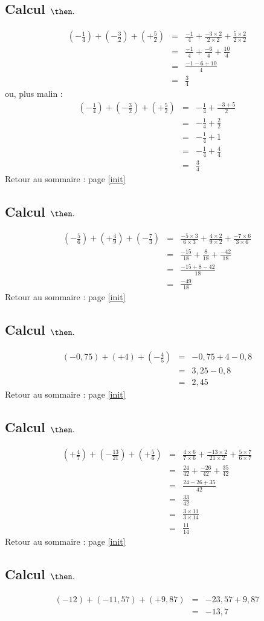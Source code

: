 \documentclass[14pt]{article}
\theoremstyle{remark}
\newcounter{n}
\renewcommand{\it}{Retour au sommaire : page \ref{init}
	\subsection{Calcul $ \mathbf{ \then}.$}\label{\then} \stepcounter{n} }
\theoremstyle{plain}
\begin{document}
	\subsection{Calcul $ \mathbf{ \then}.$}\label{\then}  
 \begin{eqnarray*}
\left(-\frac14\right)+\left(-\frac32\right)+\left(+\frac52\right) & = & \frac{-1}4 + \frac{-3\times 2}{2\times2} + \frac{5\times2}{2\times2} \\
&=& \frac{-1}4 + \frac{-6}4 + \frac{10}4\\
&=& \frac{-1-6+10}4\\
&=& \frac{3}4
\end{eqnarray*} 
ou, plus malin : \begin{eqnarray*}
\left(-\frac14\right)+\left(-\frac32\right)+\left(+\frac52\right) & = & -\frac14 + \frac{-3+5}2\\
& =& - \frac14 + \frac{2}2\\
&=& -\frac14+1\\
&=& -\frac14+\frac44 \\
&=& \frac34
\end{eqnarray*} 
\it \begin{eqnarray*}
\left(-\frac56\right)+\left(+\frac49\right)+\left(-\frac73\right) &= & \frac{-5\times3}{6\times3} + \frac{4\times2}{9\times2} + \frac{-7\times 6}{3\times 6} \\ 
&=& \frac{-15}{18} + \frac{8}{18} +\frac{-42}{18} \\
&=& \frac{-15+8-42}{18}\\
&=& \frac{-49}{18}
\end{eqnarray*}
\it \begin{eqnarray*}(-0,75) + (+4) + \left(-\frac45\right) & =& -0,75 + 4 - 0,8 \\ 
&=& 3,25 - 0,8\\
&=& 2,45
\end{eqnarray*}
\it \begin{eqnarray*}
\left(+\frac47\right)+\left(-\frac{13}{21}\right)+\left(+\frac56\right) &=& \frac{4\times6}{7\times6} + \frac{-13\times2}{21\times2} + \frac{5\times7}{6\times 7} \\
&=& \frac{24}{42} + \frac{-26}{42} + \frac{35}{42}\\
&=& \frac{24-26+35}{42}\\
&=& \frac{33}{42}\\
&=& \frac{3\times 11}{3\times 14}\\
&=& \frac{11}{14}
\end{eqnarray*}
\it \begin{eqnarray*}(-12)+(-11,57)+(+9,87) &=& -23,57 + 9,87 \\ &=& -13,7\end{eqnarray*}
\end{document}
